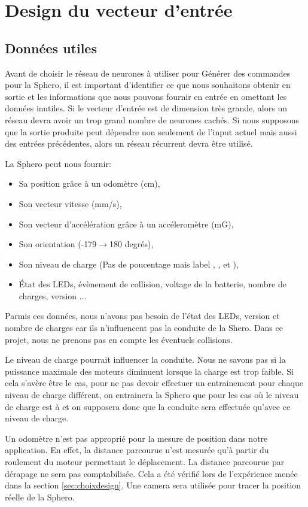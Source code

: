 \section{Design du vecteur d'entrée}
\subsection{Données utiles}
Avant de choisir le réseau de neurones à utiliser pour Générer des commandes pour la Sphero, il est important d'identifier ce que nous souhaitons obtenir en sortie et les informations que nous pouvons fournir en entrée en omettant les données inutiles.
Si le vecteur d'entrée est de dimension très grande, alors un réseau \rbf devra avoir un trop grand nombre de neurones cachés\cite{Gauthier}.
Si nous supposons que la sortie produite peut dépendre non seulement de l'input actuel mais aussi des entrées précédentes, alors un réseau récurrent devra être utilisé.

La Sphero peut nous fournir:\cite{SDKofficiels}
\begin{itemize}
 \item Sa position grâce à un odomètre (cm),
 \item Son vecteur vitesse (mm/s),
 \item Son vecteur d'accélération grâce à un accéleromètre (mG),
 \item Son orientation (-179$\rightarrow$180 degrés),
 \item Son niveau de charge (Pas de poucentage mais label , ,  et ),
 \item État des LEDs, évènement de collision, voltage de la batterie, nombre de charges, version ...
\end{itemize}

Parmis ces données, nous n'avons pas besoin de l'état des LEDs, version et nombre de charges car ils n'influencent pas la conduite de la Shero.
Dans ce projet, nous ne prenons pas en compte les éventuels collisions.

Le niveau de charge pourrait influencer la conduite.
Nous ne savons pas si la puissance maximale des moteurs diminuent lorsque la charge est trop faible.
Si cela s'avère être le cas, pour ne pas devoir effectuer un entrainement pour chaque niveau de charge différent, on entrainera la Sphero que pour les cas où le niveau de charge est à  et on supposera donc que la conduite sera effectuée qu'avec ce niveau de charge.

Un odomètre n'est pas approprié pour la mesure de position dans notre application.
En effet, la distance parcourue n'est mesurée qu'à partir du roulement du moteur permettant le déplacement.
La distance parcourue par dérapage ne sera pas comptabilisée.
Cela a été vérifié lors de l'expérience menée dans la section \ref{sec:choixdesign}.
Une camera sera utilisée pour tracer la position réelle de la Sphero.

